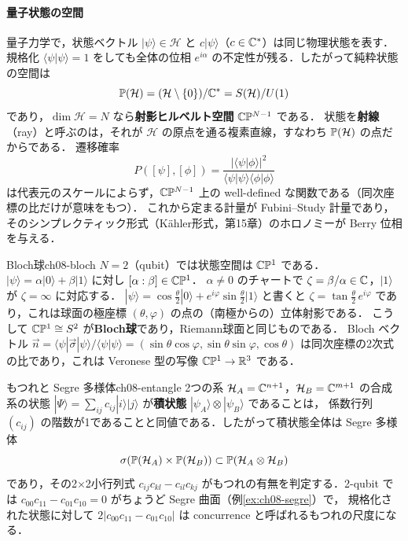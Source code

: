 \paragraph{量子状態の空間}
量子力学で，状態ベクトル $|\psi\rangle\in\mathcal H$ と $c|\psi\rangle$（$c\in\mathbb{C}^*$）は同じ物理状態を表す．
規格化 $\langle\psi|\psi\rangle=1$ をしても全体の位相 $e^{i\alpha}$ の不定性が残る．したがって純粋状態の空間は
\[
  \mathbb{P}(\mathcal H)=(\mathcal H\setminus\{0\})/\mathbb{C}^*=S(\mathcal H)/U(1)
\]
であり，$\dim\mathcal H=N$ なら\textbf{射影ヒルベルト空間} $\mathbb{C}\mathbb{P}^{N-1}$ である．
状態を\textbf{射線}（ray）と呼ぶのは，それが $\mathcal H$ の原点を通る複素直線，すなわち $\mathbb{P}(\mathcal H)$ の点だからである．
遷移確率
\[
  P([\psi],[\phi])=\frac{|\langle\psi|\phi\rangle|^2}{\langle\psi|\psi\rangle\langle\phi|\phi\rangle}
\]
は代表元のスケールによらず，$\mathbb{C}\mathbb{P}^{N-1}$ 上の well-defined な関数である（同次座標の比だけが意味をもつ）．
これから定まる計量が Fubini–Study 計量であり，そのシンプレクティック形式（Kähler形式，第15章）のホロノミーが Berry 位相を与える．

\begin{myex}{Bloch球}{ch08-bloch}
$N=2$（qubit）では状態空間は $\mathbb{C}\mathbb{P}^1$ である．$|\psi\rangle=\alpha|0\rangle+\beta|1\rangle$ に対し $[\alpha:\beta]\in\mathbb{C}\mathbb{P}^1$．
$\alpha\neq0$ のチャートで $\zeta=\beta/\alpha\in\mathbb{C}$，$|1\rangle$ が $\zeta=\infty$ に対応する．
$|\psi\rangle=\cos\frac\theta2|0\rangle+e^{i\varphi}\sin\frac\theta2|1\rangle$ と書くと $\zeta=\tan\frac\theta2\,e^{i\varphi}$ であり，これは球面の極座標 $(\theta,\varphi)$ の点の（南極からの）立体射影である．
こうして $\mathbb{C}\mathbb{P}^1\cong S^2$ が\textbf{Bloch球}であり，Riemann球面と同じものである．
Bloch ベクトル $\vec n=\langle\psi|\vec\sigma|\psi\rangle/\langle\psi|\psi\rangle=(\sin\theta\cos\varphi,\sin\theta\sin\varphi,\cos\theta)$ は同次座標の2次式の比であり，これは Veronese 型の写像 $\mathbb{C}\mathbb{P}^1\to\mathbb{R}^3$ である．
\end{myex}

\begin{myex}{もつれと Segre 多様体}{ch08-entangle}
2つの系 $\mathcal H_A=\mathbb{C}^{n+1}$，$\mathcal H_B=\mathbb{C}^{m+1}$ の合成系の状態 $|\Psi\rangle=\sum_{ij}c_{ij}|i\rangle|j\rangle$ が\textbf{積状態} $|\psi_A\rangle\otimes|\psi_B\rangle$ であることは，
係数行列 $(c_{ij})$ の階数が1であることと同値である．したがって積状態全体は Segre 多様体
\[
  \sigma(\mathbb{P}(\mathcal H_A)\times\mathbb{P}(\mathcal H_B))\subset\mathbb{P}(\mathcal H_A\otimes\mathcal H_B)
\]
であり，その2×2小行列式 $c_{ij}c_{kl}-c_{il}c_{kj}$ がもつれの有無を判定する．2-qubit では $c_{00}c_{11}-c_{01}c_{10}=0$ がちょうど Segre 曲面（例\ref{ex:ch08-segre}）で，
規格化された状態に対して $2|c_{00}c_{11}-c_{01}c_{10}|$ は concurrence と呼ばれるもつれの尺度になる．
\end{myex}

